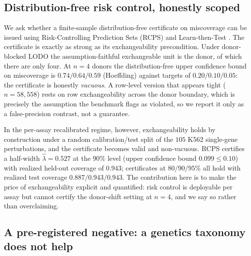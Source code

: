\documentclass{article}
\begin{document}
\subsection{Distribution-free risk control, honestly scoped}

We ask whether a finite-sample distribution-free certificate on
miscoverage can be issued using Risk-Controlling Prediction Sets (RCPS)
\citep{bates2021rcps} and Learn-then-Test \citep{angelopoulos2021learn}.
The certificate is exactly as strong as its exchangeability precondition.
Under donor-blocked LODO the assumption-faithful exchangeable unit is the
donor, of which there are only four. At $n{=}4$ donors the
distribution-free upper confidence bound on miscoverage is
$0.74/0.64/0.59$ (Hoeffding) against targets of $0.20/0.10/0.05$: the
certificate is honestly \emph{vacuous}. A row-level version that appears
tight ($n{=}58{,}558$) rests on row exchangeability across the donor
boundary, which is precisely the assumption the benchmark flags as
violated, so we report it only as a false-precision contrast, not a
guarantee.

In the per-assay recalibrated regime, however, exchangeability holds by
construction under a random calibration/test split of the $105$ K562
single-gene perturbations, and the certificate becomes valid and
non-vacuous. RCPS certifies a half-width $\hat{\lambda}=0.527$ at the
$90\%$ level (upper confidence bound $0.099 \le 0.10$) with realized
held-out coverage of $0.943$; certificates at $80/90/95\%$ all hold with
realized test coverage $0.887/0.943/0.943$. The contribution here is to
make the price of exchangeability explicit and quantified: risk control
is deployable per assay but cannot certify the donor-shift setting at
$n{=}4$, and we say so rather than overclaiming.

\subsection{A pre-registered negative: a genetics taxonomy does not help}
\end{document}
